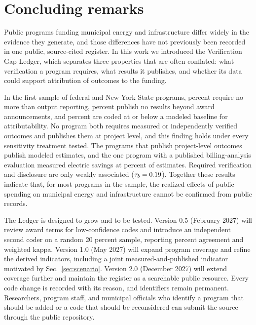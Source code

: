 \documentclass[10pt,twocolumn,letterpaper]{article}
\begin{document}
\section{Concluding remarks}\label{sec:concl}

Public programs funding municipal energy and infrastructure differ widely in the evidence they generate, and those differences have not previously been recorded in one public, source-cited register. In this work we introduced the Verification Gap Ledger, which separates three properties that are often conflated: what verification a program requires, what results it publishes, and whether its data could support attribution of outcomes to the funding.

In the first sample of \nProg{} federal and New York State programs, \pctRleOne{} percent require no more than output reporting, \pctCzero{} percent publish no results beyond award announcements, and \pctAleOne{} percent are coded at or below a modeled baseline for attributability. No program both requires measured or independently verified outcomes and publishes them at project level, and this finding holds under every sensitivity treatment tested. The programs that publish project-level outcomes publish modeled estimates, and the one program with a published billing-analysis evaluation measured electric savings at \rtemElec{} percent of estimates. Required verification and disclosure are only weakly associated ($\tau_b = 0.19$). Together these results indicate that, for most programs in the sample, the realized effects of public spending on municipal energy and infrastructure cannot be confirmed from public records.

The Ledger is designed to grow and to be tested. Version 0.5 (February 2027) will review award terms for low-confidence codes and introduce an independent second coder on a random 20 percent sample, reporting percent agreement and weighted kappa. Version 1.0 (May 2027) will expand program coverage and refine the derived indicators, including a joint measured-and-published indicator motivated by Sec.~\ref{sec:scenario}. Version 2.0 (December 2027) will extend coverage further and maintain the register as a searchable public resource. Every code change is recorded with its reason, and identifiers remain permanent. Researchers, program staff, and municipal officials who identify a program that should be added or a code that should be reconsidered can submit the source through the public repository.
\end{document}
